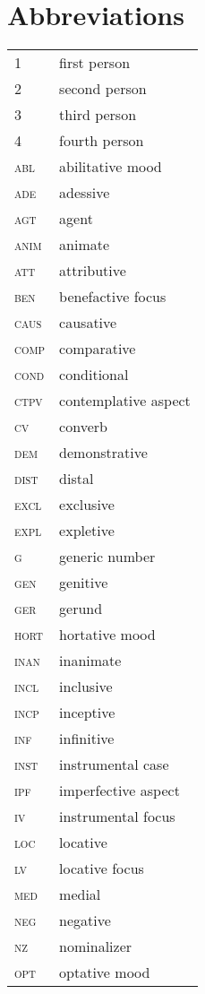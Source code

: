 \chapter*{Abbreviations}

	\begin{longtabu} to 0.8
		1		& first person\\
		2		& second person\\
		3		& third person\\
		4		& fourth person\\
		abl		& abilitative mood\\
		ade		& adessive\\
		agt		& agent\\
		anim	& animate\\
		att		& attributive\\
		ben		& benefactive focus\\
		caus	& causative\\
		comp	& comparative\\
		cond	& conditional\\
		ctpv	& contemplative aspect\\
		cv		& converb\\
		dem		& demonstrative\\
		dist	& distal\\
		excl	& exclusive\\
		expl	& expletive\\
		g		& generic number\\
		gen 	& genitive\\
		ger		& gerund\\
		hort	& hortative mood\\
		inan	& inanimate\\
		incl	& inclusive\\
		incp	& inceptive\\
		inf		& infinitive\\
		inst	& instrumental case\\
		ipf		& imperfective aspect\\
		iv		& instrumental focus\\
		loc		& locative\\
		lv		& locative focus\\
		med		& medial\\
		neg		& negative\\
		nz		& nominalizer\\
		opt		& optative mood\\

\end{longtabu}
